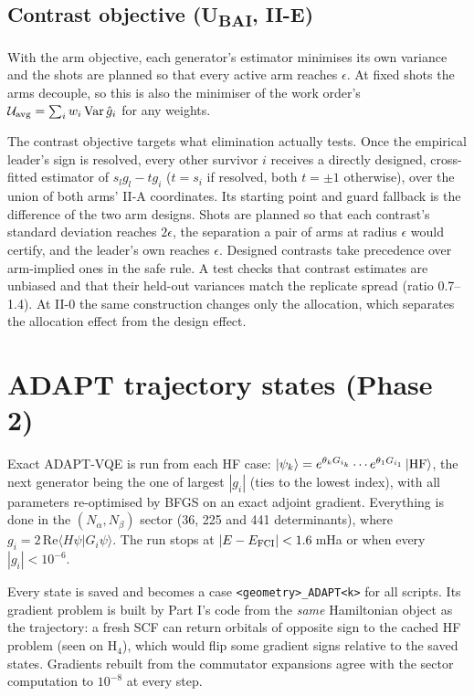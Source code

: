 \documentclass[10.5pt]{article}
\newcommand{\ket}[1]{\left|#1\right\rangle}
\newcommand{\Var}{\operatorname{Var}}
\newcommand{\code}[1]{\texttt{#1}}
\begin{document}
\subsection{Contrast objective (U\textsubscript{BAI}, II-E)}
\label{sec:contrast}

With the arm objective, each generator's estimator minimises its own variance and the shots are planned so that every active arm reaches $\epsilon$. At fixed shots the arms decouple, so this is also the minimiser of the work order's $\mathcal U_{\rm avg}=\sum_iw_i\Var\hat g_i$ for any weights.

The contrast objective targets what elimination actually tests. Once the empirical leader's sign is resolved, every other survivor $i$ receives a directly designed, cross-fitted estimator of $s_lg_l-tg_i$ ($t=s_i$ if resolved, both $t=\pm1$ otherwise), over the union of both arms' II-A coordinates. Its starting point and guard fallback is the difference of the two arm designs. Shots are planned so that each contrast's standard deviation reaches $2\epsilon$, the separation a pair of arms at radius $\epsilon$ would certify, and the leader's own reaches $\epsilon$. Designed contrasts take precedence over arm-implied ones in the safe rule. A test checks that contrast estimates are unbiased and that their held-out variances match the replicate spread (ratio 0.7--1.4). At II-0 the same construction changes only the allocation, which separates the allocation effect from the design effect.

\section{ADAPT trajectory states (Phase 2)}
\label{sec:trajectory}

Exact ADAPT-VQE is run from each HF case: $\ket{\psi_k}=e^{\theta_kG_{i_k}}\cdots e^{\theta_1G_{i_1}}\ket{\rm HF}$, the next generator being the one of largest $|g_i|$ (ties to the lowest index), with all parameters re-optimised by BFGS on an exact adjoint gradient. Everything is done in the $(N_\alpha,N_\beta)$ sector (36, 225 and 441 determinants), where $g_i=2\,\mathrm{Re}\langle H\psi|G_i\psi\rangle$. The run stops at $|E-E_{\rm FCI}|<1.6$\,mHa or when every $|g_i|<10^{-6}$.

Every state is saved and becomes a case \code{<geometry>\_ADAPT<k>} for all scripts. Its gradient problem is built by Part I's code from the \emph{same} Hamiltonian object as the trajectory: a fresh SCF can return orbitals of opposite sign to the cached HF problem (seen on H$_4$), which would flip some gradient signs relative to the saved states. Gradients rebuilt from the commutator expansions agree with the sector computation to $10^{-8}$ at every step.
\end{document}
